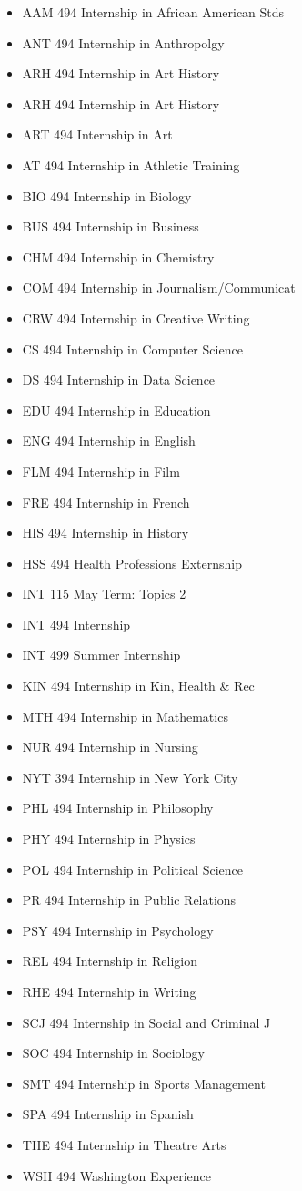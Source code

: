 \documentclass[
  letterpaper,
]{scrbook}
\providecommand{\tightlist}{%
  \setlength{\itemsep}{0pt}\setlength{\parskip}{0pt}}
\begin{document}
\begin{itemize}
\tightlist
\item
  AAM 494 Internship in African American Stds
\item
  ANT 494 Internship in Anthropolgy
\item
  ARH 494 Internship in Art History
\item
  ARH 494 Internship in Art History
\item
  ART 494 Internship in Art
\item
  AT 494 Internship in Athletic Training
\item
  BIO 494 Internship in Biology
\item
  BUS 494 Internship in Business
\item
  CHM 494 Internship in Chemistry
\item
  COM 494 Internship in Journalism/Communicat
\item
  CRW 494 Internship in Creative Writing
\item
  CS 494 Internship in Computer Science
\item
  DS 494 Internship in Data Science
\item
  EDU 494 Internship in Education
\item
  ENG 494 Internship in English
\item
  FLM 494 Internship in Film
\item
  FRE 494 Internship in French
\item
  HIS 494 Internship in History
\item
  HSS 494 Health Professions Externship
\item
  INT 115 May Term: Topics 2
\item
  INT 494 Internship
\item
  INT 499 Summer Internship
\item
  KIN 494 Internship in Kin, Health \& Rec
\item
  MTH 494 Internship in Mathematics
\item
  NUR 494 Internship in Nursing
\item
  NYT 394 Internship in New York City
\item
  PHL 494 Internship in Philosophy
\item
  PHY 494 Internship in Physics
\item
  POL 494 Internship in Political Science
\item
  PR 494 Internship in Public Relations
\item
  PSY 494 Internship in Psychology
\item
  REL 494 Internship in Religion
\item
  RHE 494 Internship in Writing
\item
  SCJ 494 Internship in Social and Criminal J
\item
  SOC 494 Internship in Sociology
\item
  SMT 494 Internship in Sports Management
\item
  SPA 494 Internship in Spanish
\item
  THE 494 Internship in Theatre Arts
\item
  WSH 494 Washington Experience
\end{itemize}
\end{document}
